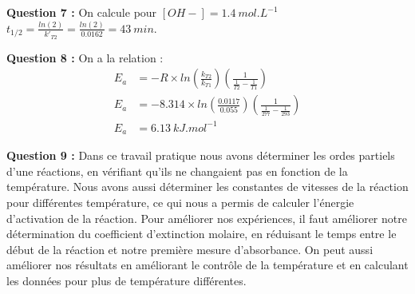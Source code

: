 \documentclass[12pt]{article}
\begin{document}
\textbf{Question 7 : } On calcule pour $[OH-]=1.4 \ mol.L^{-1}$ $t_{1/2}=\frac{ln(2)}{k'_{T2}}=\frac{ln(2)}{0.0162}=43 \ min$.

\textbf{Question 8 :} On a la relation :
\begin{align*}
    E_a &= -R \times ln \left(\frac{k_{T2}}{k_{T1}}\right) \left(\frac{1}{\frac{1}{T2}-\frac{1}{T1}}\right) \\
    E_a &= - 8.314 \times ln \left( \frac{0.0117}{0.055}\right) \left(\frac{1}{\frac{1}{277} - \frac{1}{293}}\right) \\
    E_a &= 6.13 \ kJ.mol^{-1}
\end{align*}

\textbf{Question 9 :} Dans ce travail pratique nous avons déterminer les ordes partiels d'une réactions, en vérifiant qu'ils ne changaient pas en fonction de la température.
Nous avons aussi déterminer les constantes de vitesses de la réaction pour différentes température, ce qui nous a permis de calculer l'énergie d'activation de la réaction.
Pour améliorer nos expériences, il faut améliorer notre détermination du coefficient d'extinction molaire, en réduisant le temps entre le début de la réaction et notre première mesure d'absorbance.
On peut aussi améliorer nos résultats en améliorant le contrôle de la température et en calculant les données pour plus de température différentes.
\end{document}
